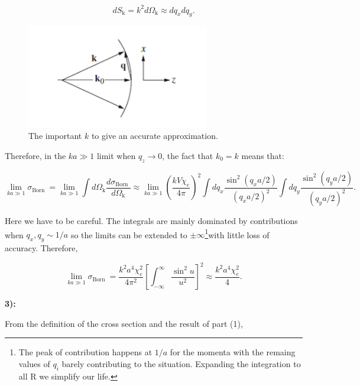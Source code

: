 \begin{equation}
	d S_{\mathrm{k}}=k^{2} d \Omega_{\mathrm{k}} \approx d q_{x} d q_{y}.
\end{equation}

\begin{figure}[h]
	\includegraphics[width=8cm]{figures/cubegeometry.png}
	\centering
	\caption{The important $k$ to give an accurate approximation.}
\end{figure}

Therefore, in the $k a \gg 1$ limit when $q_{z} \rightarrow 0$, the fact that $k_{0}=k$ means that:

\begin{equation}
	\lim _{k a \gg 1} \sigma_{\text {Born }}=\lim _{k a \gg 1} \int d \Omega_{\mathrm{k}} \frac{d \sigma_{\text {Born }}}{d \Omega_{\mathrm{k}}} \approx \lim _{k a \gg 1}\left(\frac{k V \chi_{e}}{4 \pi}\right)^{2} \int d q_{x} \frac{\sin ^{2}\left(q_{x} a / 2\right)}{\left(q_{x} a / 2\right)^{2}} \int d q_{y} \frac{\sin ^{2}\left(q_{y} a / 2\right)}{\left(q_{y} a / 2\right)^{2}}.
\end{equation}

Here we have to be careful. The integrals are mainly dominated by contributions when $q_{x}, q_{y} \sim 1 / a$ so the limits can be extended to $\pm \infty$\footnote{The peak of contribution happens at $1/a$ for the momenta with the remaing values of $q_{i}$ barely contributing to the situation. Expanding the integration to all $\mathrm{R}$ we simplify our life.}with little loss of accuracy. Therefore,

\begin{equation}
	\lim _{k a \gg 1} \sigma_{\text {Born }}=\frac{k^{2} a^{4} \chi_{e}^{2}}{4 \pi^{2}}\left[\int_{-\infty}^{\infty} \frac{\sin ^{2} u}{u^{2}}\right]^{2}\approx\frac{k^{2} a^{4} \chi_{e}^{2}}{4}.
\end{equation}

\textbf{3):}

From the definition of the cross section and the result of part (1),


